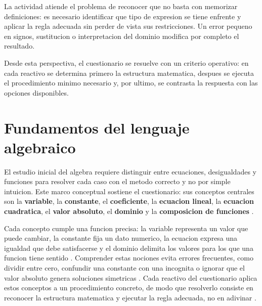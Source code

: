 \documentclass[
	spanish,
	letterpaper, oneside
]{article}
\begin{document}
La actividad atiende el problema de reconocer que no basta con memorizar definiciones: es necesario identificar que tipo de expresion se tiene enfrente y aplicar la regla adecuada sin perder de vista sus restricciones. Un error pequeno en signos, sustitucion o interpretacion del dominio modifica por completo el resultado.

Desde esta perspectiva, el cuestionario se resuelve con un criterio operativo: en cada reactivo se determina primero la estructura matematica, despues se ejecuta el procedimiento minimo necesario y, por ultimo, se contrasta la respuesta con las opciones disponibles.

%
%
\section{Fundamentos del lenguaje algebraico}

El estudio inicial del algebra requiere distinguir entre ecuaciones, desigualdades y funciones para resolver cada caso con el metodo correcto y no por simple intuicion. Este marco conceptual sostiene el cuestionario: sus conceptos centrales son la \textbf{variable}, la \textbf{constante}, el \textbf{coeficiente}, la \textbf{ecuacion lineal}, la \textbf{ecuacion cuadratica}, el \textbf{valor absoluto}, el \textbf{dominio} y la \textbf{composicion de funciones} \citep{stewart2017precalculo,sullivan2013algebra}.

Cada concepto cumple una funcion precisa: la variable representa un valor que puede cambiar, la constante fija un dato numerico, la ecuacion expresa una igualdad que debe satisfacerse y el dominio delimita los valores para los que una funcion tiene sentido \citep{swokowski2011algebra}. Comprender estas nociones evita errores frecuentes, como dividir entre cero, confundir una constante con una incognita o ignorar que el valor absoluto genera soluciones simetricas \citep{zill2012algebra}. Cada reactivo del cuestionario aplica estos conceptos a un procedimiento concreto, de modo que resolverlo consiste en reconocer la estructura matematica y ejecutar la regla adecuada, no en adivinar \citep{unadm100TecnicasDidacticas2023}.
\end{document}
